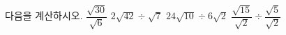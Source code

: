 다음을 계산하시오.
 $\dfrac{\sqrt{30}}{\sqrt{6}}$
 $2\sqrt{42}\div\sqrt{7}$
 $24\sqrt{10}\div 6\sqrt{2}$
 $\dfrac{\sqrt{15}}{\sqrt{2}}\div\dfrac{\sqrt{5}}{\sqrt{2}}$
